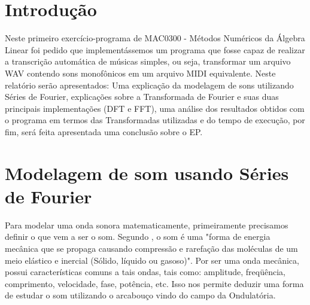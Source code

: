 \documentclass[brazil,times]{abnt}
\begin{document}





\data{\today}

\capa

\folhaderosto

\tableofcontents

\chapter{Introdução\label{cap:introducao}}
	Neste primeiro exercício-programa de MAC0300 - Métodos Numéricos da Álgebra Linear foi pedido que implementássemos um programa que fosse capaz de realizar a transcrição automática de músicas simples, ou seja, transformar um arquivo WAV contendo sons monofônicos em um arquivo MIDI equivalente. Neste relatório serão apresentados: Uma explicação da modelagem de sons utilizando Séries de Fourier, explicações sobre a Transformada de Fourier e suas duas principais implementações (DFT e FFT), uma análise dos resultados obtidos com o programa em termos das Transformadas utilizadas e do tempo de execução, por fim, será feita apresentada uma conclusão sobre o EP.

\chapter{Modelagem de som usando Séries de Fourier}
	Para modelar uma onda sonora matematicamente, primeiramente precisamos definir o que vem a ser o som. Segundo \cite{ufpe:computacao-musical}, o som é uma "forma de energia mecânica que se propaga causando compressão e rarefação das moléculas de um meio elástico e inercial (Sólido, líquido ou gasoso)". Por ser uma onda mecânica, possui características comuns a tais ondas, tais como: amplitude, freqüência, comprimento, velocidade, fase, potência, etc. Isso nos permite deduzir uma forma de estudar o som utilizando o arcabouço vindo do campo da Ondulatória.
	
\end{document}
